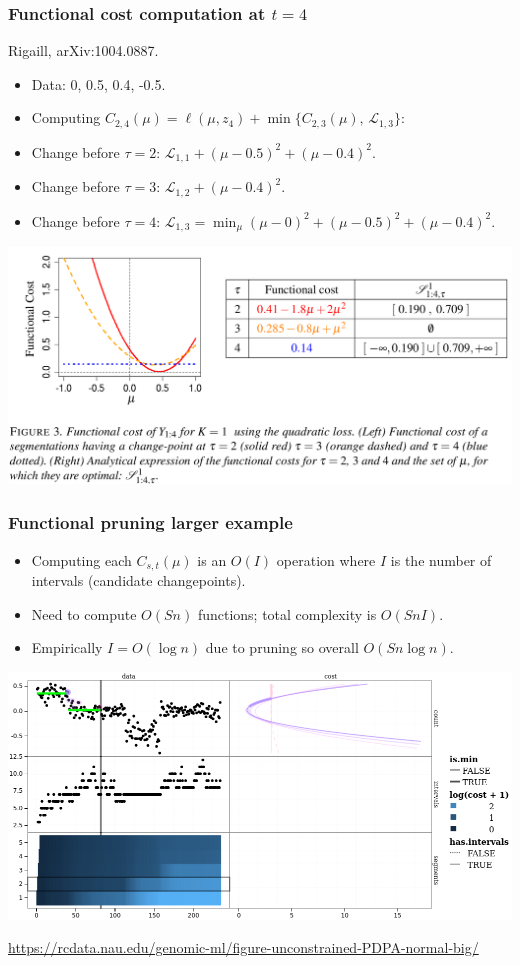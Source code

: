 \documentclass{beamer}
\begin{document}
\begin{frame}
  \frametitle{Functional cost computation at $t=4$}
  Rigaill, arXiv:1004.0887.

  \begin{itemize}
  \item Data: 0, 0.5, 0.4, -0.5. 
  \item Computing $C_{2,4}(\mu) = \ell(\mu, z_4) + \min\{C_{2,3}(\mu),\, \mathcal
    L_{1,3}\}$:
  \item Change before $\tau=2$: $\mathcal L_{1,1} + (\mu-0.5)^2+(\mu-0.4)^2$.
  \item Change before $\tau=3$: $\mathcal L_{1,2}+(\mu-0.4)^2$.
  \item Change before $\tau=4$: $\mathcal L_{1,3}=\min_\mu (\mu-0)^2+(\mu-0.5)^2+(\mu-0.4)^2$.
  \end{itemize}

  \includegraphics[width=\textwidth]{screenshot-figure-3}
\end{frame}

\begin{frame}
  \frametitle{Functional pruning larger example}

  \begin{itemize}
  \item Computing each $C_{s,t}(\mu)$ is an $O(I)$ operation where $I$
    is the number of intervals (candidate changepoints).
  \item Need to compute $O(Sn)$ functions; total complexity is $O(SnI)$.
  \item Empirically $I=O(\log n)$ due to pruning so overall $O(Sn\log n)$.
  \end{itemize}

\includegraphics[width=\textwidth]{screenshot-PDPA-demo}
%    

\url{https://rcdata.nau.edu/genomic-ml/figure-unconstrained-PDPA-normal-big/}
\end{frame}
\end{document}
